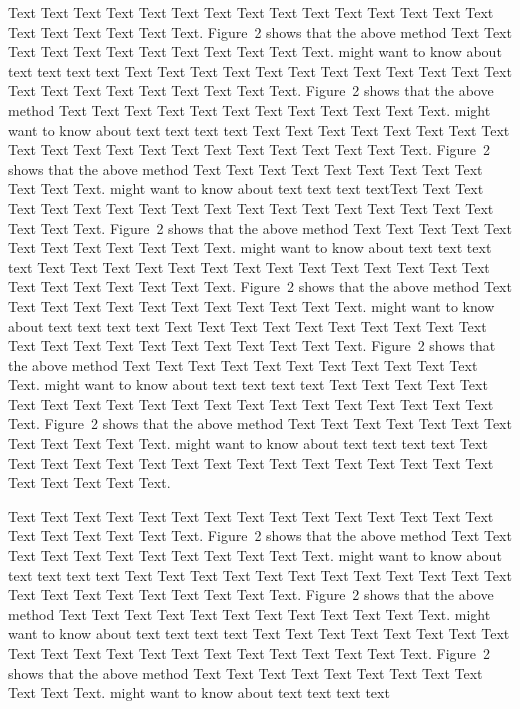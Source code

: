 \documentclass{bioinfo}
\begin{document}
\begin{methods}
Text Text Text Text Text Text  Text Text Text Text Text Text Text
Text Text  Text Text Text Text Text Text.
Figure~2\vphantom{\ref{fig:02}} shows that the above method  Text
Text Text Text  Text Text Text Text Text Text  Text Text.
\citealp{Boffelli03} might want to know about  text text text text
Text Text Text Text Text Text  Text Text Text Text Text Text Text
Text Text  Text Text Text Text Text Text.
Figure~2\vphantom{\ref{fig:02}} shows that the above method  Text
Text Text Text  Text Text Text Text Text Text  Text Text.
\citealp{Boffelli03} might want to know about  text text text text
Text Text Text Text Text Text Text Text Text Text Text Text Text
Text Text  Text Text Text Text Text Text.
Figure~2\vphantom{\ref{fig:02}} shows that the above method  Text
Text Text Text  Text Text Text Text Text Text  Text Text.
\citealp{Boffelli03} might want to know about  text text text
textText Text Text Text Text Text  Text Text Text Text Text Text
Text Text Text  Text Text Text Text Text Text.
Figure~2\vphantom{\ref{fig:02}} shows that the above method  Text
Text Text Text  Text Text Text Text Text Text  Text Text.
\citealp{Boffelli03} might want to know about  text text text text
Text Text Text Text Text Text Text Text Text Text Text Text Text
Text Text  Text Text Text Text Text Text.
Figure~2\vphantom{\ref{fig:02}} shows that the above method  Text
Text Text Text  Text Text Text Text Text Text  Text Text.
\citealp{Boffelli03} might want to know about  text text text text
Text Text Text Text Text Text  Text Text Text Text Text Text Text
Text Text  Text Text Text Text Text Text.
Figure~2\vphantom{\ref{fig:02}} shows that the above method  Text
Text Text Text  Text Text Text Text Text Text  Text Text.
\citealp{Boffelli03} might want to know about  text text text text
Text Text Text Text Text Text Text Text Text Text Text Text Text
Text Text  Text Text Text Text Text Text.
Figure~2\vphantom{\ref{fig:02}} shows that the above method  Text
Text Text Text  Text Text Text Text Text Text  Text Text.
\citealp{Boffelli03} might want to know about  text text text text
Text Text Text Text Text Text  Text Text Text Text Text Text Text
Text Text  Text Text Text Text Text Text.

\enlargethispage{6pt}


Text Text Text Text Text Text  Text Text Text Text Text Text Text
Text Text  Text Text Text Text Text Text.
Figure~2\vphantom{\ref{fig:02}} shows that the above method  Text
Text Text Text  Text Text Text Text Text Text  Text Text.
\citealp{Boffelli03} might want to know about  text text text text
Text Text Text Text Text Text  Text Text Text Text Text Text Text
Text Text  Text Text Text Text Text Text.
Figure~2\vphantom{\ref{fig:02}} shows that the above method  Text
Text Text Text  Text Text Text Text Text Text  Text Text.
\citealp{Boffelli03} might want to know about  text text text text
Text Text Text Text Text Text Text Text Text Text Text Text Text
Text Text  Text Text Text Text Text Text.
Figure~2\vphantom{\ref{fig:02}} shows that the above method  Text
Text Text Text  Text Text Text Text Text Text  Text Text.
\citealp{Boffelli03} might want to know about  text text text text




\end{methods}
\end{document}
